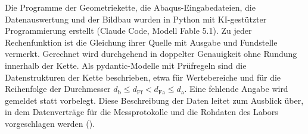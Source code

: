 Die Programme der Geometriekette, die Abaqus-Eingabedateien, die Datenauswertung und der Bildbau wurden in Python mit KI-gestützter Programmierung erstellt (Claude Code, Modell Fable 5.1). Zu jeder Rechenfunktion ist die Gleichung ihrer Quelle mit Ausgabe und Fundstelle vermerkt. Gerechnet wird durchgehend in doppelter Genauigkeit ohne Rundung innerhalb der Kette. Als pydantic-Modelle mit Prüfregeln sind die Datenstrukturen der Kette beschrieben, etwa für Wertebereiche und für die Reihenfolge der Durchmesser $d_{\mathrm{b}} \le d_{\mathrm{Ff}} < d_{\mathrm{Fa}} \le d_{\mathrm{a}}$. Eine fehlende Angabe wird gemeldet statt vorbelegt. Diese Beschreibung der Daten leitet zum Ausblick über, in dem Datenverträge für die Messprotokolle und die Rohdaten des Labors vorgeschlagen werden ().


